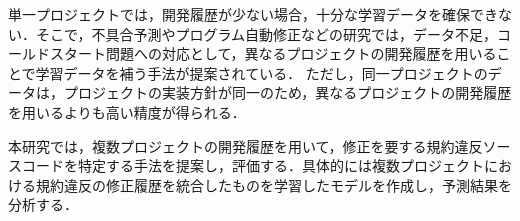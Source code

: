 \documentclass[T,J]{fose} %
\begin{document}
単一プロジェクトでは，開発履歴が少ない場合，十分な学習データを確保できない．そこで，不具合予測やプログラム自動修正などの研究では，データ不足，コールドスタート問題への対応として，異なるプロジェクトの開発履歴を用いることで学習データを補う手法が提案されている\cite{Tabassum}．
ただし，同一プロジェクトのデータは，プロジェクトの実装方針が同一のため，異なるプロジェクトの開発履歴を用いるよりも高い精度が得られる．

本研究では，複数プロジェクトの開発履歴を用いて，修正を要する規約違反ソースコードを特定する手法を提案し，評価する．具体的には複数プロジェクトにおける規約違反の修正履歴を統合したものを学習したモデルを作成し，予測結果を分析する．





\end{document}
